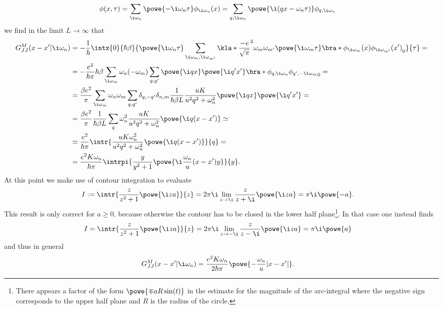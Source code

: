 \documentclass[english, parskip=full]{scrartcl}
\begin{document}
\begin{align}
\phi(x,\tau) &= \sum_{\i\omega_n} \powe{-\i\omega_n\tau} \phi_{\i\omega_n} (x) = \sum_{q,\i\omega_n} \powe{\i (qx - \omega_n\tau)} \phi_{q,\i\omega_n}
\end{align} 
we find in the limit $L\rightarrow \infty$ that
\begin{align}
G_{JJ}^M (x-x'|\i\omega_n) &= -\frac{1}{\hbar} \intx{0}{\hbar\beta}{\powe{\i\omega_n\tau} \sum_{\i\omega_m, \i\omega_{m'}} \kla*{\frac{-e}{\sqrt{\pi}}}^2 \omega_m\omega_{m'} \powe{\i\omega_m \tau} \bra*{\phi_{\i\omega_m}(x) \phi_{\i\omega_{m'}}(x')}_0  }{\tau} = \\
&= -\frac{e^2}{\hbar\pi} \hbar\beta \sum_{\i\omega_{m}} \omega_n(-\omega_{m}) \sum_{q,q'} \powe{\i qx} \powe{\i q'x'} \bra*{\phi_{q,\i\omega_n} \phi_{q',-\i\omega_{m}}}_0 = \\
&= \frac{\beta e^2}{\pi} \sum_{\i\omega_{m}} \omega_n\omega_{m} \sum_{q,q'} \delta_{q,-q'} \delta_{n,m} \frac{1}{\hbar\beta L} \frac{uK}{u^2q^2 + \omega_n^2} \powe{\i qx} \powe{\i q'x'} = \\
&= \frac{\beta e^2}{\pi} \frac{1}{\hbar\beta L} \sum_q \omega_n^2 \frac{uK}{u^2q^2 + \omega_n^2} \powe{\i q(x-x')} \simeq \\
&\simeq \frac{e^2}{\hbar \pi} \intr{\frac{uK\omega_n^2}{u^2q^2 + \omega_n^2} \powe{\i q(x-x')}}{q} = \\
&= \frac{e^2K \omega_n}{\hbar \pi} \intrpi{\frac{y}{y^2 + 1} \powe{\i \frac{\omega_n}{u}(x-x') y}}{y}.
\end{align}
At this point we make use of contour integration to evaluate
\begin{align}
I &:= \intr{\frac{z}{z^2 + 1} \powe{\i za}}{z} = 2\pi\i \lim_{z \rightarrow \i} \frac{z}{z + \i} \powe{\i za} = \pi\i \powe{-a}.
\end{align}
This result is only correct for $a\ge 0$, because otherwise the contour has to be closed in the lower half plane\footnote{There appears a factor of the form $\powe{\mp aR\sin (t)}$ in the estimate for the magnitude of the arc-integral where the negative sign corresponds to the upper half plane and $R$ is the radius of the circle.}.
In that case one instead finds
\begin{align}
I &= \intr{\frac{z}{z^2 + 1} \powe{\i za}}{z} = 2\pi\i \lim_{z \rightarrow -\i} \frac{z}{z - \i} \powe{\i za} = \pi\i \powe{a}
\end{align}
and thus in general
\begin{align}
G_{JJ}^M(x-x'|\i\omega_n) &= \frac{e^2K\omega_n}{2\hbar\pi} \powe{- \frac{\omega_n}{u} |x-x'|}.
\end{align}
\end{document}
